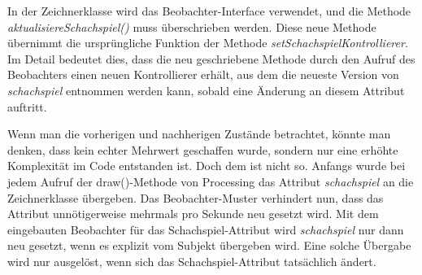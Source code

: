 In der Zeichnerklasse wird das Beobachter-Interface verwendet, und die Methode \textit{aktualisiereSchachspiel()} muss überschrieben werden. 
Diese neue Methode übernimmt die ursprüngliche Funktion der Methode \textit{setSchachspielKontrollierer}. 
Im Detail bedeutet dies, dass die neu geschriebene Methode durch den Aufruf des Beobachters einen neuen Kontrollierer erhält, aus dem die neueste Version von \textit{schachspiel} entnommen werden kann, sobald eine Änderung an diesem Attribut auftritt.

Wenn man die vorherigen und nachherigen Zustände betrachtet, könnte man denken, dass kein echter Mehrwert geschaffen wurde, sondern nur eine erhöhte Komplexität im Code entstanden ist. 
Doch dem ist nicht so. 
Anfangs wurde bei jedem Aufruf der draw()-Methode von Processing das Attribut \textit{schachspiel} an die Zeichnerklasse übergeben. 
Das Beobachter-Muster verhindert nun, dass das Attribut unnötigerweise mehrmals pro Sekunde neu gesetzt wird.
Mit dem eingebauten Beobachter für das Schachspiel-Attribut wird \textit{schachspiel} nur dann neu gesetzt, wenn es explizit vom Subjekt übergeben wird. 
Eine solche Übergabe wird nur ausgelöst, wenn sich das Schachspiel-Attribut tatsächlich ändert.

